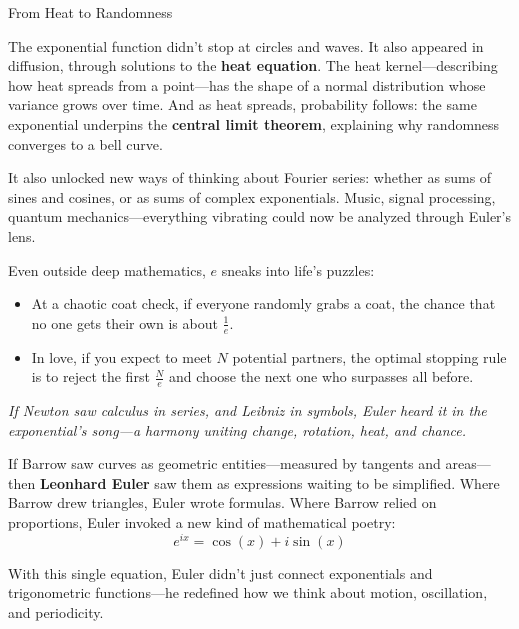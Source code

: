 \begin{HistoricalSidebar}{From Heat to Randomness}

The exponential function didn’t stop at circles and waves. It also appeared in diffusion, through solutions to the \textbf{heat equation}. The heat kernel—describing how heat spreads from a point—has the shape of a normal distribution whose variance grows over time. And as heat spreads, probability follows: the same exponential underpins the \textbf{central limit theorem}, explaining why randomness converges to a bell curve.

It also unlocked new ways of thinking about Fourier series: whether as sums of sines and cosines, or as sums of complex exponentials. Music, signal processing, quantum mechanics—everything vibrating could now be analyzed through Euler’s lens.

Even outside deep mathematics, \( e \) sneaks into life’s puzzles:

\begin{itemize}
    \item At a chaotic coat check, if everyone randomly grabs a coat, the chance that no one gets their own is about \( \frac{1}{e} \).
    \item In love, if you expect to meet \( N \) potential partners, the optimal stopping rule is to reject the first \( \frac{N}{e} \) and choose the next one who surpasses all before.
\end{itemize}

\vspace{1em}

\begin{center}
\textit{If Newton saw calculus in series, and Leibniz in symbols, Euler heard it in the exponential’s song—a harmony uniting change, rotation, heat, and chance.}
\end{center}


If Barrow saw curves as geometric entities—measured by tangents and areas—then \textbf{Leonhard Euler} saw them as expressions waiting to be simplified. Where Barrow drew triangles, Euler wrote formulas. Where Barrow relied on proportions, Euler invoked a new kind of mathematical poetry:  
\[
e^{ix} = \cos(x) + i \sin(x)
\]

With this single equation, Euler didn’t just connect exponentials and trigonometric functions—he redefined how we think about motion, oscillation, and periodicity.

\end{HistoricalSidebar}

